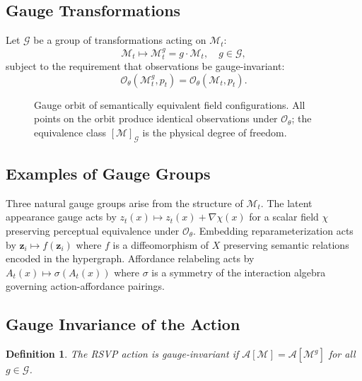 \documentclass[11pt]{article}
\newtheorem{definition}[theorem]{Definition}
\begin{document}
\subsection{Gauge Transformations}

Let $\mathcal{G}$ be a group of transformations acting on $\mathcal{M}_t$:
\[
\mathcal{M}_t \mapsto \mathcal{M}_t^g
=
g \cdot \mathcal{M}_t,
\quad g \in \mathcal{G},
\]
subject to the requirement that observations be gauge-invariant:
\[
\mathcal{O}_\theta(\mathcal{M}_t^g, p_t) =
\mathcal{O}_\theta(\mathcal{M}_t, p_t).
\]

\begin{figure}[h]
\centering
{}
\caption{Gauge orbit of semantically equivalent field configurations.
All points on the orbit produce identical observations under
$\mathcal{O}_\theta$; the equivalence class $[\mathcal{M}]_{\mathcal{G}}$
is the physical degree of freedom.}
\end{figure}

\subsection{Examples of Gauge Groups}

Three natural gauge groups arise from the structure of $\mathcal{M}_t$.
The latent appearance gauge acts by $z_t(x) \mapsto z_t(x) + \nabla \chi(x)$
for a scalar field $\chi$ preserving perceptual equivalence under
$\mathcal{O}_\theta$.
Embedding reparameterization acts by $\mathbf{z}_i \mapsto f(\mathbf{z}_i)$
where $f$ is a diffeomorphism of $X$ preserving semantic relations encoded
in the hypergraph.
Affordance relabeling acts by $A_t(x) \mapsto \sigma(A_t(x))$ where
$\sigma$ is a symmetry of the interaction algebra governing
action-affordance pairings.

\subsection{Gauge Invariance of the Action}

\begin{definition}
The RSVP action is gauge-invariant if
$\mathcal{A}[\mathcal{M}] = \mathcal{A}[\mathcal{M}^g]$
for all $g \in \mathcal{G}$.
\end{definition}
\end{document}
